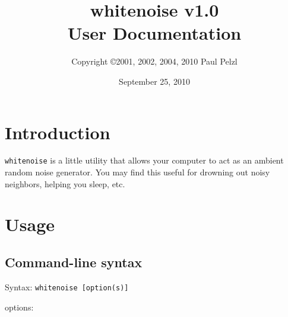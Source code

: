 \documentclass[12pt,oneside,notitlepage]{article}
\title{whitenoise v1.0 \\ User Documentation}
\author{Copyright \copyright 2001, 2002, 2004, 2010 Paul Pelzl}
\date{September 25, 2010}
\begin{document}
\maketitle

\section{Introduction}
{\tt whitenoise} is a little utility that allows your computer to act as an ambient
random noise generator.  You may find this useful for drowning out noisy
neighbors, helping you sleep, etc.


\section{Usage}

\subsection{Command-line syntax}
Syntax:  {\tt whitenoise [option(s)]}

\noindent
options:
\end{document}
